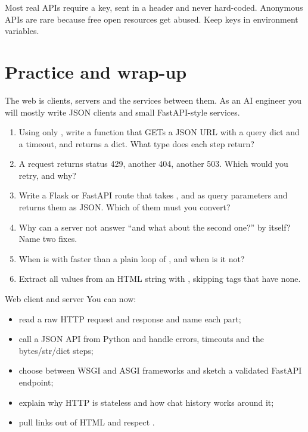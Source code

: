 Most real APIs require a key, sent in a header and never hard-coded. Anonymous APIs are rare
because free open resources get abused. Keep keys in environment variables.

\section{Practice and wrap-up}

The web is clients, servers and the services between them. As an AI engineer you will mostly write
JSON clients and small FastAPI-style services.

\begin{practice}
\begin{enumerate}[leftmargin=*]
\item Using only , write a function that GETs a JSON URL with a query dict and a
timeout, and returns a dict. What type does each step return?
\item A request returns status 429, another 404, another 503. Which would you retry, and why?
\item Write a Flask or FastAPI route  that takes ,  and
 as query parameters and returns them as JSON. Which of them must you convert?
\item Why can a server not answer ``and what about the second one?'' by itself? Name two fixes.
\item When is  with  faster than a plain loop of ,
and when is it not?
\item Extract all  values from an HTML string with , skipping tags
that have none.
\end{enumerate}
\end{practice}

\begin{achievement}{Web client and server}
You can now:
\begin{itemize}[leftmargin=*]
\item read a raw HTTP request and response and name each part;
\item call a JSON API from Python and handle errors, timeouts and the bytes/str/dict steps;
\item choose between WSGI and ASGI frameworks and sketch a validated FastAPI endpoint;
\item explain why HTTP is stateless and how chat history works around it;
\item pull links out of HTML and respect .
\end{itemize}
\end{achievement}

